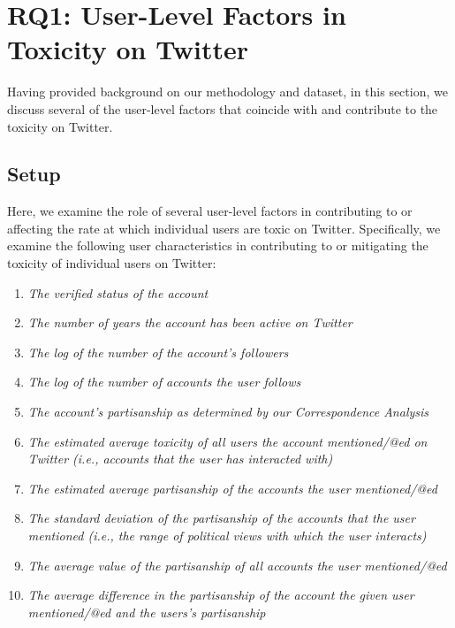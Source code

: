 \section{RQ1:  User-Level Factors in Toxicity on Twitter\label{sec:toxic_middle}}
Having provided background on our methodology and dataset, in this section, we discuss several of the user-level factors that coincide with and contribute to the toxicity on Twitter. 


\subsection{Setup}
Here, we examine the role of several user-level factors in contributing to or affecting the rate at which individual users are toxic on Twitter. Specifically, we examine the following user characteristics in contributing to or mitigating the toxicity of individual users on Twitter: 

\begin{enumerate}

\item \emph{The verified status of the account}
\item \emph{The number of years the account has been active on Twitter}
\item \emph{The log of the number of the account's followers}
\item \emph{The log of the number of accounts the user follows}
\item \emph{The account's partisanship as determined by our Correspondence Analysis}
\item \emph{The estimated average toxicity of all users the account mentioned/@ed on Twitter (\textit{i.e.}, accounts that the user has interacted with)}
\item  \emph{The estimated average partisanship of the accounts the user mentioned/@ed}
\item \emph{The standard deviation of the partisanship of the accounts that the user mentioned (\textit{i.e.}, the range of political views with which the user interacts)}
\item \emph{The average value of the partisanship of all accounts the user mentioned/@ed}
\item \emph{The average difference in the partisanship of the account the given user mentioned/@ed and the users's partisanship}



\end{enumerate}

